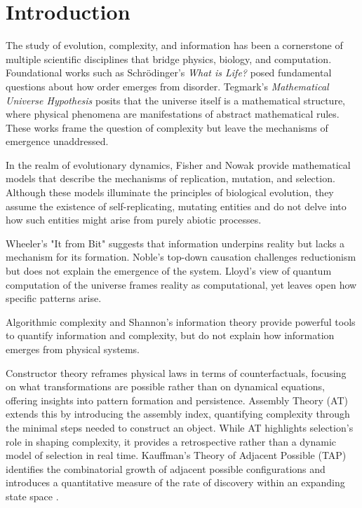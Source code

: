 \documentclass[preprint,12pt]{elsarticle}
\begin{document}

\section{Introduction}

The study of evolution, complexity, and information has been a cornerstone of multiple scientific disciplines that bridge physics, biology, and computation. Foundational works such as Schrödinger's \textit{What is Life?} \cite{schrodinger1944life} posed fundamental questions about how order emerges from disorder. Tegmark's \textit{Mathematical Universe Hypothesis} \cite{tegmark2008mathematical} posits that the universe itself is a mathematical structure, where physical phenomena are manifestations of abstract mathematical rules. These works frame the question of complexity but leave the mechanisms of emergence unaddressed.

In the realm of evolutionary dynamics, Fisher \cite{fisher1930genetical} and Nowak \cite{nowak2006evolutionary} provide mathematical models that describe the mechanisms of replication, mutation, and selection. Although these models illuminate the principles of biological evolution, they assume the existence of self-replicating, mutating entities and do not delve into how such entities might arise from purely abiotic processes. 

Wheeler's "It from Bit" \cite{wheeler1990itbit} suggests that information underpins reality but lacks a mechanism for its formation. Noble's top-down causation \cite{noble2012causality} challenges reductionism but does not explain the emergence of the system. Lloyd's view of quantum computation of the universe \cite{lloyd2006programming} frames reality as computational, yet leaves open how specific patterns arise.


Algorithmic complexity \cite{kolmogorov1965complexity} \cite{chaitin1977algorithmic} \cite{solomonoff1964formal} and Shannon’s information theory \cite{shannon1948mathematical} provide powerful tools to quantify information and complexity, but do not explain how information emerges from physical systems.

Constructor theory \cite{deutsch2013constructor} reframes physical laws in terms of counterfactuals, focusing on what transformations are possible rather than on dynamical equations, offering insights into pattern formation and persistence. Assembly Theory (AT) \cite{walker2023nature} extends this by introducing the assembly index, quantifying complexity through the minimal steps needed to construct an object. While AT highlights selection's role in shaping complexity, it provides a retrospective rather than a dynamic model of selection in real time. Kauffman’s Theory of Adjacent Possible (TAP) identifies the combinatorial growth of adjacent possible configurations and introduces a quantitative measure of the rate of discovery within an expanding state space \cite{kauffman2024tap}.
\end{document}
